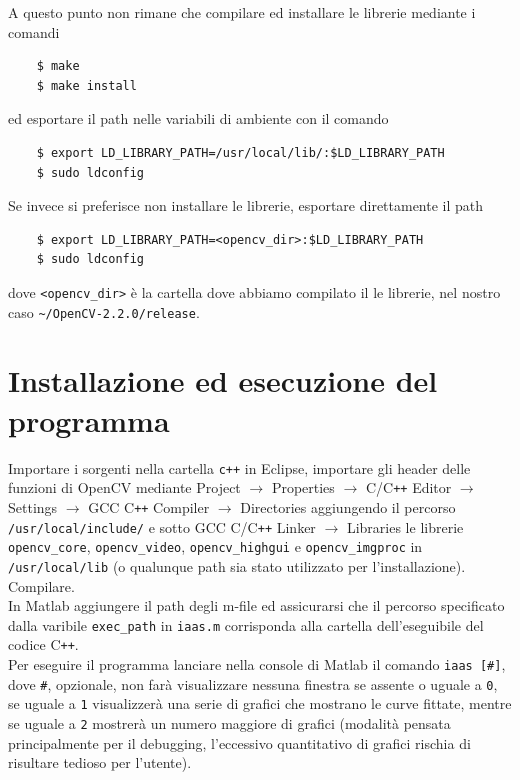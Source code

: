 \documentclass[12pt]{report}
\begin{document}
\noindent A questo punto non rimane che compilare ed installare le librerie mediante i comandi

\begin{verbatim}
	$ make
	$ make install
\end{verbatim}

\noindent ed esportare il path nelle variabili di ambiente con il comando

\begin{verbatim}
	$ export LD_LIBRARY_PATH=/usr/local/lib/:$LD_LIBRARY_PATH
	$ sudo ldconfig
\end{verbatim}

\noindent Se invece si preferisce non installare le librerie, esportare direttamente il path 

\begin{verbatim}
	$ export LD_LIBRARY_PATH=<opencv_dir>:$LD_LIBRARY_PATH
	$ sudo ldconfig
\end{verbatim}

\noindent dove \verb|<opencv_dir>| \`e la cartella dove abbiamo compilato il le librerie, nel nostro caso \verb|~/OpenCV-2.2.0/release|.

\section{Installazione ed esecuzione del programma}
\noindent Importare i sorgenti nella cartella \verb|c++| in Eclipse, importare gli header delle funzioni di OpenCV mediante Project $\rightarrow$ Properties  $\rightarrow$ C\slash C\verb|++| Editor $\rightarrow$ Settings $\rightarrow$ GCC C\verb|++| Compiler $\rightarrow$ Directories aggiungendo il percorso \verb|/usr/local/include/| e sotto GCC C\slash C\verb|++| Linker $\rightarrow$ Libraries le librerie \verb|opencv_core|, \verb|opencv_video|, \verb|opencv_highgui| e \verb|opencv_imgproc| in \verb|/usr/local/lib| (o qualunque path sia stato utilizzato per l'installazione).\\
Compilare.\\

\noindent In Matlab aggiungere il path degli m-file ed assicurarsi che il percorso specificato dalla varibile \verb|exec_path| in \verb|iaas.m| corrisponda alla cartella dell'eseguibile del codice C\verb|++|.\\
Per eseguire il programma lanciare nella console di Matlab il comando \verb|iaas [#]|, dove \verb|#|, opzionale, non far\`a visualizzare nessuna finestra se assente o uguale a \verb|0|, se uguale a \verb|1| visualizzer\`a una serie di grafici che mostrano le curve fittate, mentre se uguale a \verb|2| mostrer\`a un numero maggiore di grafici (modalit\`a pensata principalmente per il debugging, l'eccessivo quantitativo di grafici rischia di risultare tedioso per l'utente).

\printbibliography
\end{document}
